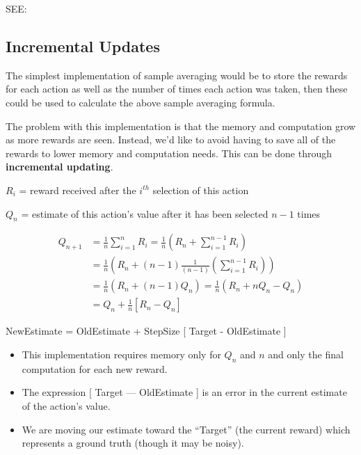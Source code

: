 SEE: 

\subsection{Incremental Updates}
The simplest implementation of sample averaging would be to store the rewards for each action as well as the number of times each action was taken, then these could be used to calculate the above sample averaging formula.

The problem with this implementation is that the memory and computation grow as more rewards are seen. Instead, we’d like to avoid having to save all of the rewards to lower memory and computation needs. This can be done through \textbf{incremental updating}.

\vspace{0.3cm}

$R_i$ = reward received after the $i^{th}$ selection of this action

$Q_n$ = estimate of this action’s value after it has been selected $n-1$ times

\begin{align}    
    Q_{n+1} &= \displaystyle\frac{1}{n} \sum_{i=1}^{n} R_i = \displaystyle\frac{1}{n} \left( R_n + \sum_{i=1}^{n-1} R_i \right) \\
    &= \displaystyle\frac{1}{n} \left( R_n + (n-1) \displaystyle\frac{1}{(n-1)}  \left(\sum_{i=1}^{n-1} R_i\right) \right)\\
    &= \displaystyle\frac{1}{n} (R_n + (n-1)Q_n) = \displaystyle\frac{1}{n} (R_n + nQ_n - Q_n)\\
    &= Q_n + \displaystyle\frac{1}{n} [R_n - Q_n]
\end{align}

NewEstimate = OldEstimate + StepSize [ Target - OldEstimate ]
\vspace{0.2cm}

\begin{itemize}
    \item This implementation requires memory only for $Q_n$ and $n$ and only the final computation for each new reward.
    \item The expression [ Target — OldEstimate ] is an error in the current estimate of the action’s value.
    \item We are moving our estimate toward the “Target” (the current reward) which represents a ground truth (though it may be noisy).
\end{itemize}

